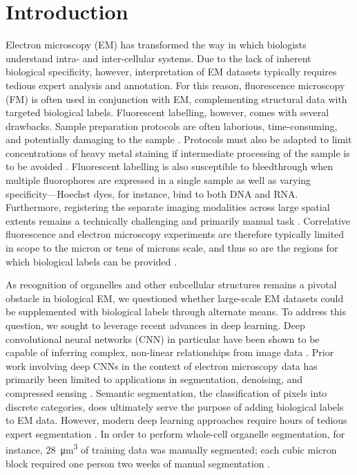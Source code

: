\section{Introduction}
\label{sec:4.1_intro}

Electron microscopy (EM) has transformed the way in which biologists understand intra- and inter-cellular systems. Due to the lack of inherent biological specificity, however, interpretation of EM datasets typically requires tedious expert analysis and annotation. For this reason, fluorescence microscopy (FM) is often used in conjunction with EM, complementing structural data with targeted biological labels. Fluorescent labelling, however, comes with several drawbacks. Sample preparation protocols are often laborious, time-consuming, and potentially damaging to the sample \cite{christiansen2018silico}. Protocols must also be adapted to limit concentrations of heavy metal staining if intermediate processing of the sample is to be avoided \cite{kuipers2015scanning, lane2021optimization}. Fluorescent labelling is also susceptible to bleedthrough when multiple fluorophores are expressed in a single sample as well as varying specificity---Hoechst dyes, for instance, bind to both DNA and RNA. Furthermore, registering the separate imaging modalities across large spatial extents remains a technically challenging and primarily manual task \cite{muller2014correlative, paul2017ec, russell20173d}. Correlative fluorescence and electron microscopy experiments are therefore typically limited in scope to the micron or tens of microns scale, and thus so are the regions for which biological labels can be provided \cite{de2015correlated, russell20173d}.

As recognition of organelles and other subcellular structures remains a pivotal obstacle in biological EM, we questioned whether large-scale EM datasets \cite{de2020large, dittmayer2021preparation} could be supplemented with biological labels through alternate means. To address this question, we sought to leverage recent advances in deep learning. Deep convolutional neural networks (CNN) in particular have been shown to be capable of inferring complex, non-linear relationships from image data \cite{he2016deep, januszewski2018high}. Prior work involving deep CNNs in the context of electron microscopy data has primarily been limited to applications in segmentation, denoising, and compressed sensing \cite{ede2021deep}. Semantic segmentation, the classification of pixels into discrete categories, does ultimately serve the purpose of adding biological labels to EM data. However, modern deep learning approaches require hours of tedious expert segmentation \cite{takemura2013visual, helmstaedter2013cellular, huang2014identifying, heinrich2018synaptic, liu2020automatic, spiers2021deep}. In order to perform whole-cell organelle segmentation, for instance, \SI{28}{\micro\meter^3} of training data was manually segmented; each cubic micron block required one person two weeks of manual segmentation \cite{heinrich2020automatic}.

